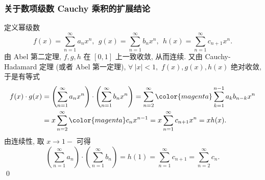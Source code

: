 
\begin{frame}
\frametitle{关于数项级数 Cauchy 乘积的扩展结论}

\startproof[bg=yellow, fg=red]
定义幂级数
\[
f(x) = \sum\limits_{n=1}^{\infty} a_n x^n, ~~
g(x) = \sum\limits_{n=1}^{\infty} b_n x^n, ~~
h(x) = \sum\limits_{n=1}^{\infty} c_{n+1} x^n.
\]
由 Abel 第二定理, $f,g,h$ 在 $[0, 1]$ 上一致收敛, 从而连续. 又由 Cauchy-Hadamard 定理 (或者 Abel 第一定理), $\forall ~ |x| < 1,$ $f(x),g(x),h(x)$ 绝对收敛, 于是有等式
\begin{align*}
f(x) \cdot g(x) & = \left( \sum\limits_{n=1}^{\infty} a_n x^n \right) \cdot \left( \sum\limits_{n=1}^{\infty} b_n x^n \right) = \sum\limits_{n=2}^{\infty} {\color{magenta}\sum\limits_{k=1}^{n-1} a_k b_{n-k}} x^n \\
& = x \sum\limits_{n=2}^{\infty} {\color{magenta} c_n} x^{n-1} = x \sum\limits_{n=1}^{\infty} c_{n+1} x^n = x h(x).
\end{align*}
由连续性, 取 $x \to 1-$ 可得
\[
\left( \sum\limits_{n=1}^{\infty} a_n \right) \cdot \left( \sum\limits_{n=1}^{\infty} b_n \right) = h(1) = \sum\limits_{n=1}^{\infty} c_{n+1} = \sum\limits_{n=2}^{\infty} c_n.
\]
\qed

\end{frame}



